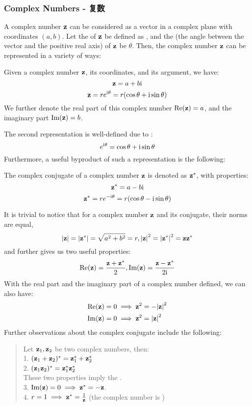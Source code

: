 \subsubsection{Complex Numbers - 复数}
A complex number $\mathbf{z}$ can be considered as a vector in a complex plane with coordinates $(a, b)$. Let the  of $\mathbf{z}$ be defined as , and the  (the angle between the vector and the positive real axis) of $\mathbf{z}$ be $\theta$. Then, the complex number $\mathbf{z}$ can be represented in a variety of ways:
\begin{definition}
    Given a complex number $\mathbf{z}$, its coordinates, and its argument, we have:
    $$\mathbf{z} = a + b\mathrm{i}$$
    $$\mathbf{z} = re^{\mathrm{i} \theta} = r(\cos \theta + \mathrm{i} \sin \theta)$$
    We further denote the real part of this complex number $\text{Re}(\mathbf{z}) = a$, and the imaginary part $\text{Im}(\mathbf{z}) = b$.
\end{definition}
The second representation is well-defined due to :
$$e^{\mathrm{i} \theta} = \cos \theta + \mathrm{i} \sin \theta$$
Furthermore, a useful byproduct of such a representation is the following:
\begin{definition}
    The complex conjugate of a complex number $\mathbf{z}$ is denoted as $\mathbf{z}^{*}$, with properties:
    $$\mathbf{z}^{*} = a - b\mathrm{i}$$
    $$\mathbf{z}^{*} = re^{-\mathrm{i} \theta} = r(\cos \theta - \mathrm{i} \sin \theta)$$
\end{definition}
It is trivial to notice that for a complex number $\mathbf{z}$ and its conjugate, their norms are equal,
$$\abs{\mathbf{z}} = \abs{\mathbf{z}^{*}} = \sqrt{a^2 + b^2} = r, \abs{\mathbf{z}}^2 = \abs{\mathbf{z}^{*}}^2 = \mathbf{z} \mathbf{z}^{*}$$
and further gives us two useful properties:
$$\text{Re}(\mathbf{z}) = \frac{\mathbf{z} + \mathbf{z}^{*}}{2}, \text{Im}(\mathbf{z}) = \frac{\mathbf{z} - \mathbf{z}^{*}}{2\mathrm{i}}$$
With the real part and the imaginary part of a complex number defined, we can also have:
\begin{align*}
    \text{Re}(\mathbf{z}) = 0 &\implies \mathbf{z}^2 = -\abs{\mathbf{z}}^2 \\
    \text{Im}(\mathbf{z}) = 0 &\implies \mathbf{z}^2 = \abs{\mathbf{z}}^2
\end{align*}
Further observations about the complex conjugate include the following:
\begin{quote}
    Let $\mathbf{z}_1, \mathbf{z}_2$ be two complex numbers, then: \\
    1. $(\mathbf{z}_1 + \mathbf{z}_2)^{*} = \mathbf{z}_1^{*} + \mathbf{z}_2^{*}$ \\
    2. $(\mathbf{z}_1 \mathbf{z}_2)^{*} = \mathbf{z}_1^{*}\mathbf{z}_2^{*}$ \\
    These two properties imply the . \\
    3. $\text{Im}(\mathbf{z}) = 0 \implies \mathbf{z}^{*} = -\mathbf{z}$. \\
    4. $r = 1 \implies \mathbf{z}^{*} = \frac{1}{\mathbf{z}}$ (the complex number is )
\end{quote}
\newpage
